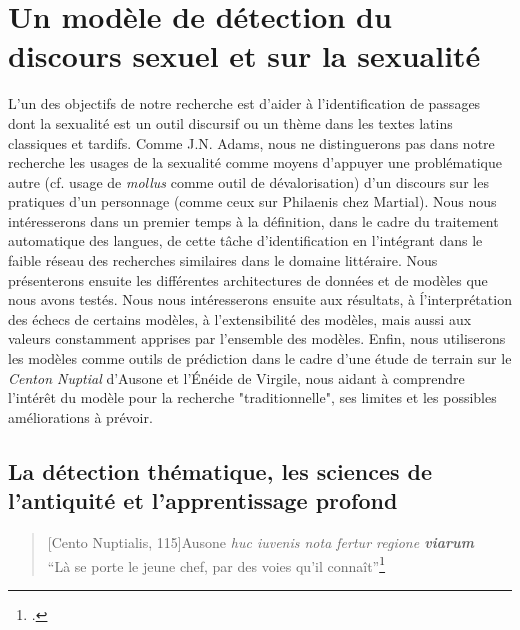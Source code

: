 \chapter{Un modèle de détection du discours sexuel et sur la sexualité}

L'un des objectifs de notre recherche est d'aider à l'identification de passages dont la sexualité est un outil discursif ou un thème dans les textes latins classiques et tardifs. Comme J.N. Adams, nous ne distinguerons pas dans notre recherche les usages de la sexualité comme moyens d'appuyer une problématique autre (cf. usage de \textit{mollus} comme outil de dévalorisation) d'un discours sur les pratiques d'un personnage (comme ceux sur Philaenis chez Martial). Nous nous intéresserons dans un premier temps à la définition, dans le cadre du traitement automatique des langues, de cette tâche d'identification en l'intégrant dans le faible réseau des recherches similaires dans le domaine littéraire. Nous présenterons ensuite les différentes architectures de données et de modèles que nous avons testés. Nous nous intéresserons ensuite aux résultats, à ĺ'interprétation des échecs de certains modèles, à l'extensibilité des modèles, mais aussi aux valeurs constamment apprises par l'ensemble des modèles. Enfin, nous utiliserons les modèles comme outils de prédiction dans le cadre d'une étude de terrain sur le \textit{Centon Nuptial} d'Ausone et l'Énéide de Virgile, nous aidant à comprendre l'intérêt du modèle pour la recherche "traditionnelle", ses limites et les possibles améliorations à prévoir.

\section{La détection thématique, les sciences de l'antiquité et l'apprentissage profond}


\begin{quote}[Cento Nuptialis, 115]{Ausone}
    \textit{huc iuvenis nota fertur regione \textbf{viarum}} \\
    \enquote{Là se porte le jeune chef, par des voies qu'il connaît}\footcite{ausone_d_2010}
\end{quote}


